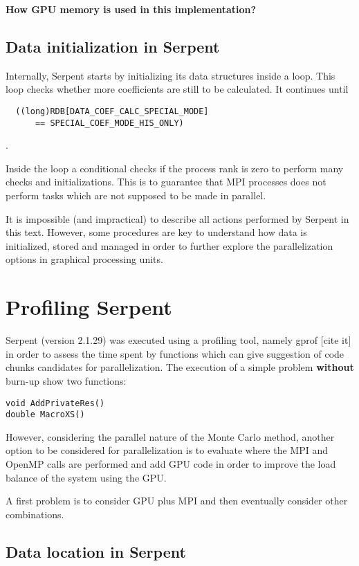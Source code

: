\documentclass[twoside,a4paper,12pt,english,draft]{anstrans}
\begin{document}
\textbf{How GPU memory is used in this implementation?}

\subsection{Data initialization in Serpent}
Internally, Serpent starts by initializing its data structures inside a loop. This loop checks
whether more coefficients are still to be calculated. It continues until \begin{verbatim}
  ((long)RDB[DATA_COEF_CALC_SPECIAL_MODE]
      == SPECIAL_COEF_MODE_HIS_ONLY)
\end{verbatim}.

Inside the loop a conditional checks if the process rank is zero to perform many checks and initializations.
This is to guarantee that MPI processes does not perform tasks which are not supposed to be made in parallel.

It is impossible (and impractical) to describe all actions performed by Serpent in this text. However, some
procedures are key to understand how data is initialized, stored and managed in order to further explore
the parallelization options in graphical processing units.

\section{Profiling Serpent}

Serpent (version 2.1.29) was executed using a profiling tool, namely gprof [cite it] in order
to assess the time spent by functions which can give suggestion of code chunks candidates for
parallelization. The execution of a simple problem \textbf{without} burn-up show two functions:
\begin{verbatim}
void AddPrivateRes()
double MacroXS()
\end{verbatim}
However, considering the parallel nature of the Monte Carlo method, another option to be considered
for parallelization is to evaluate where the MPI and OpenMP calls are performed and add GPU code
in order to improve the load balance of the system using the GPU.

A first problem is to consider GPU plus MPI and then eventually consider other combinations.

\subsection{Data location in Serpent}
\end{document}
